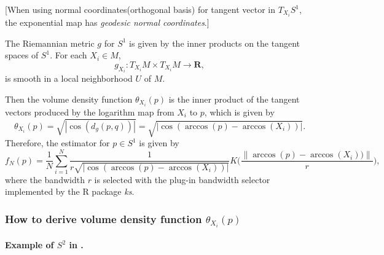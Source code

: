 \documentclass[11pt,a4paper,]{article}
\begin{document}
{[}When using normal coordinates(orthogonal basis) for tangent vector in \(T_{X_i}S^1\), the exponential map has \emph{geodesic normal coordinates}.{]}

The Riemannian metric \(g\) for \(S^1\) is given by the inner products on the tangent spaces of \(S^1\). For each \(X_i \in M\),
\[
g_{X_i}: T_{X_i}M \times T_{X_i}M \rightarrow \pmb{R},
\]
is smooth in a local neighborhood \(U\) of \(M\).

Then the volume density function \(\theta_{X_i}(p)\) is the inner product of the tangent vectors produced by the logarithm map from \(X_i\) to \(p\), which is given by
\[
\theta_{X_i}(p) = \sqrt{|\cos(d_g(p,q))|} = \sqrt{|\cos(\arccos(p) - \arccos(X_i))|}.
\]
Therefore, the estimator for \(p \in S^1\) is given by
\[
f_N(p) = \frac{1}{N} \sum_{i=1}^{N} \frac{1}{r \sqrt{|\cos(\arccos(p) - \arccos(X_i))|}} K\bigg(\frac{\|\arccos(p) - \arccos(X_i))\|}{r}\bigg),
\]
where the bandwidth \(r\) is selected with the plug-in bandwidth selector implemented by the R package \emph{ks}.

\hypertarget{how-to-derive-volume-density-function-theta_x_ip}{%
\subsubsection{\texorpdfstring{How to derive volume density function \(\theta_{X_i}(p)\)}{How to derive volume density function \textbackslash theta\_\{X\_i\}(p)}}\label{how-to-derive-volume-density-function-theta_x_ip}}

\hypertarget{example-of-s2-in-henry2009-om.}{%
\paragraph{\texorpdfstring{Example of \(S^2\) in \textcite{Henry2009-om}.}{Example of S\^{}2 in @Henry2009-om.}}\label{example-of-s2-in-henry2009-om.}}
\end{document}
